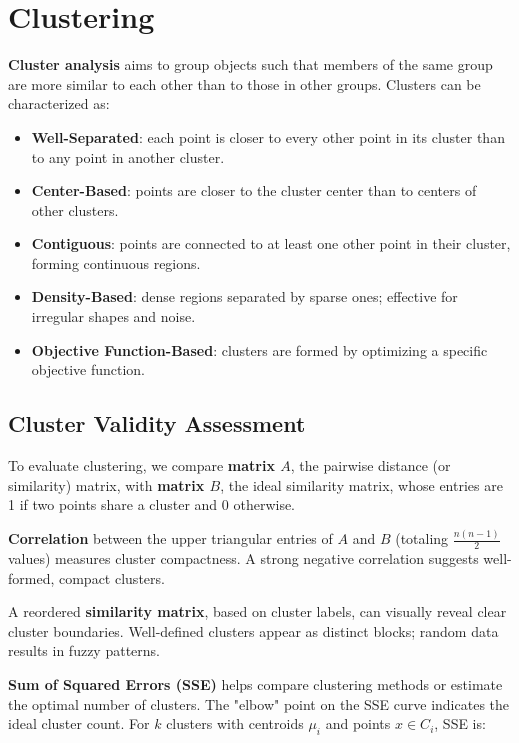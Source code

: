 \section{Clustering}

\textbf{Cluster analysis} aims to group objects such that members of the same group are more similar to each other than to those in other groups. Clusters can be characterized as:

\begin{itemize}
    \item \textbf{Well-Separated}: each point is closer to every other point in its cluster than to any point in another cluster.
    \item \textbf{Center-Based}: points are closer to the cluster center than to centers of other clusters.
    \item \textbf{Contiguous}: points are connected to at least one other point in their cluster, forming continuous regions.
    \item \textbf{Density-Based}: dense regions separated by sparse ones; effective for irregular shapes and noise.
    \item \textbf{Objective Function-Based}: clusters are formed by optimizing a specific objective function.
\end{itemize}

\subsection{Cluster Validity Assessment}

To evaluate clustering, we compare \textbf{matrix $A$}, the pairwise distance (or similarity) matrix, with \textbf{matrix $B$}, the ideal similarity matrix, whose entries are 1 if two points share a cluster and 0 otherwise.

\textbf{Correlation} between the upper triangular entries of $A$ and $B$ (totaling $\frac{n(n-1)}{2}$ values) measures cluster compactness. A strong negative correlation suggests well-formed, compact clusters.

A reordered \textbf{similarity matrix}, based on cluster labels, can visually reveal clear cluster boundaries. Well-defined clusters appear as distinct blocks; random data results in fuzzy patterns.

\textbf{Sum of Squared Errors (SSE)} helps compare clustering methods or estimate the optimal number of clusters. The "elbow" point on the SSE curve indicates the ideal cluster count. For $k$ clusters with centroids $\mu_i$ and points $x \in C_i$, SSE is:

